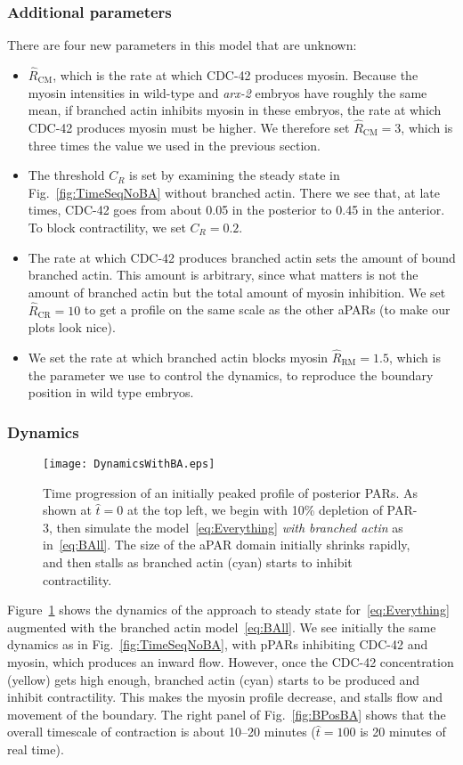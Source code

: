 \documentclass[11pt]{article}
\newcommand{\red}[1]{\color{red}#1\normalcolor}
\newcommand{\6}[1]{#1_{\text{6}}}
\newcommand{\3}[1]{#1_{\text{3}}}
\begin{document}
\subsubsection{Additional parameters}
There are four new parameters in this model that are unknown: 
\begin{itemize}
\item \red{$\hat{R}_\text{CM}$, which is the rate at which CDC-42 produces myosin. Because the myosin intensities in wild-type and \emph{arx-2} embryos have roughly the same mean, if branched actin inhibits myosin in these embryos, the rate at which CDC-42 produces myosin must be higher. We therefore set $\hat{R}_\text{CM}=3$, which is three times the value we used in the previous section.}
\item The threshold $C_R$ is set by examining the steady state in Fig.\ \ref{fig:TimeSeqNoBA} without branched actin. There we see that, at late times, CDC-42 goes from about 0.05 in the posterior to 0.45 in the anterior. To block contractility, we set $C_R=0.2$. 
\item The rate at which CDC-42 produces branched actin sets the amount of bound branched actin. This amount is arbitrary, since what matters is not the amount of branched actin but the total amount of myosin inhibition. We set $\hat R_\text{CR}=10$ to get a profile on the same scale as the other aPARs (to make our plots look nice).
\item We set the rate at which branched actin blocks myosin $\hat R_\text{RM}=1.5$, which is the parameter we use to control the dynamics, to reproduce the boundary position in wild type embryos. 
\end{itemize}

\subsubsection{Dynamics}
\begin{figure}
\centering
\texttt{[image: DynamicsWithBA.eps]}
\caption{\label{fig:TimeSeqBA} Time progression of an initially peaked profile of posterior PARs. As shown at $\hat t=0$ at the top left, we begin with 10\% depletion of PAR-3, then simulate the model\ \eqref{eq:Everything} \emph{with branched actin} as in\ \eqref{eq:BAll}. The size of the aPAR domain initially shrinks rapidly, and then stalls as branched actin (cyan) starts to inhibit contractility.}
\end{figure}

Figure\ \ref{fig:TimeSeqBA} shows the dynamics of the approach to steady state for\ \eqref{eq:Everything} augmented with the branched actin model\ \eqref{eq:BAll}. We see initially the same dynamics as in Fig.\ \ref{fig:TimeSeqNoBA}, with pPARs inhibiting CDC-42 and myosin, which produces an inward flow. However, once the CDC-42 concentration (yellow) gets high enough, branched actin (cyan) starts to be produced and inhibit contractility. This makes the myosin profile decrease, and stalls flow and movement of the boundary. The right panel of Fig.\ \ref{fig:BPosBA} shows that the overall timescale of contraction is about 10--20 minutes ($\hat t =100$ is 20 minutes of real time). 
\end{document}
